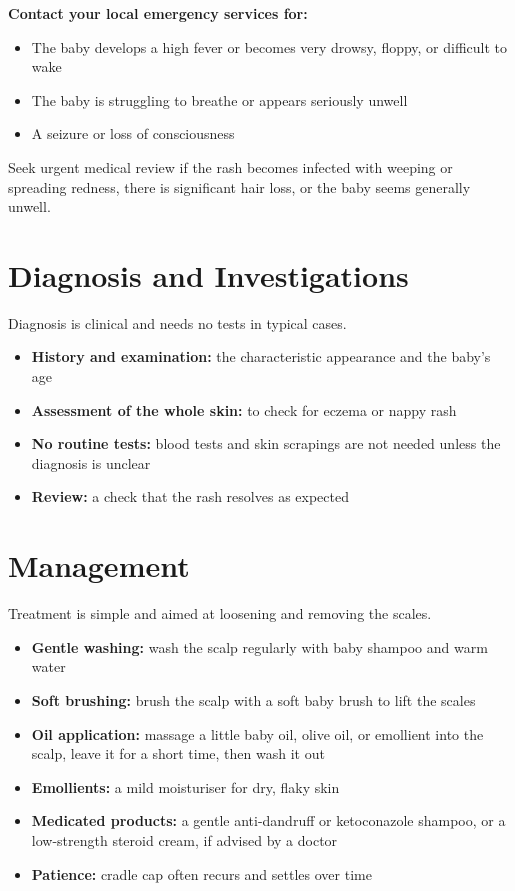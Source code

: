 \textbf{Contact your local emergency services for:}
\begin{itemize}
    \item The baby develops a high fever or becomes very drowsy, floppy, or difficult to wake
    \item The baby is struggling to breathe or appears seriously unwell
    \item A seizure or loss of consciousness
\end{itemize}

Seek urgent medical review if the rash becomes infected with weeping or spreading redness, there is significant hair loss, or the baby seems generally unwell.

\section*{Diagnosis and Investigations}
Diagnosis is clinical and needs no tests in typical cases.

\begin{itemize}
    \item \textbf{History and examination:} the characteristic appearance and the baby's age
    \item \textbf{Assessment of the whole skin:} to check for eczema or nappy rash
    \item \textbf{No routine tests:} blood tests and skin scrapings are not needed unless the diagnosis is unclear
    \item \textbf{Review:} a check that the rash resolves as expected
\end{itemize}

\section*{Management}
Treatment is simple and aimed at loosening and removing the scales.

\begin{itemize}
    \item \textbf{Gentle washing:} wash the scalp regularly with baby shampoo and warm water
    \item \textbf{Soft brushing:} brush the scalp with a soft baby brush to lift the scales
    \item \textbf{Oil application:} massage a little baby oil, olive oil, or emollient into the scalp, leave it for a short time, then wash it out
    \item \textbf{Emollients:} a mild moisturiser for dry, flaky skin
    \item \textbf{Medicated products:} a gentle anti-dandruff or ketoconazole shampoo, or a low-strength steroid cream, if advised by a doctor
    \item \textbf{Patience:} cradle cap often recurs and settles over time
\end{itemize}

